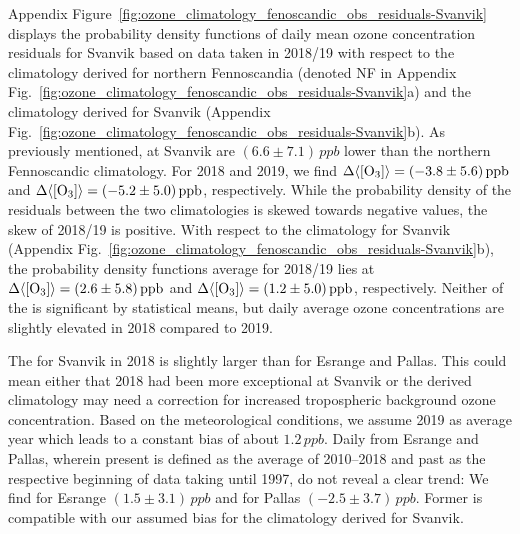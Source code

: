 \documentclass[bg, manuscript]{copernicus}
\begin{document}
Appendix Figure~\ref{fig:ozone_climatology_fenoscandic_obs_residuals-Svanvik} displays the probability density functions of daily mean ozone concentration residuals for Svanvik based on data taken in 2018/19 with respect to the climatology derived for northern Fennoscandia (denoted NF in Appendix Fig.~\ref{fig:ozone_climatology_fenoscandic_obs_residuals-Svanvik}a) and the climatology derived for Svanvik (Appendix Fig.~\ref{fig:ozone_climatology_fenoscandic_obs_residuals-Svanvik}b).
As previously mentioned, \chem{\left<[O_3]\right>} at Svanvik are $(6.6\pm 7.1)\,\unit{ppb}$ lower than the northern Fennoscandic climatology. For 2018 and 2019, we find $\Delta\chem{\left<[O_3]\right>} = (-3.8\pm 5.6)\,\unit{ppb}$ and $\Delta\chem{\left<[O_3]\right>} = (-5.2\pm 5.0)\,\unit{ppb}$, respectively. While the probability density of the residuals between the two climatologies is skewed towards negative values, the skew of 2018/19 is positive.
With respect to the climatology for Svanvik (Appendix Fig.~\ref{fig:ozone_climatology_fenoscandic_obs_residuals-Svanvik}b), the probability density functions average for 2018/19 lies at $\Delta\chem{\left<[O_3]\right>} = (2.6\pm 5.8)\,\unit{ppb}$ and $\Delta\chem{\left<[O_3]\right>} = (1.2\pm 5.0)\,\unit{ppb}$, respectively.
Neither of the \chem{\Delta\left<[O_3]\right>} is significant by statistical means, but daily average ozone concentrations are slightly elevated in 2018 compared to 2019.

The \chem{\left<\Delta\left<[O_3]\right>\right>} for Svanvik in 2018 is slightly larger than for Esrange and Pallas. This could mean either that 2018 had been more exceptional at Svanvik or the derived climatology may need a correction for increased tropospheric background ozone concentration. Based on the meteorological conditions, we assume 2019 as average year which leads to a constant bias of about $1.2\,\unit{ppb}$. Daily  from Esrange and Pallas, wherein present is defined as the average of 2010--2018 and past as the respective beginning of data taking until 1997, do not reveal a clear trend: We find for Esrange $(1.5\pm 3.1)\,\unit{ppb}$ and for Pallas $(-2.5\pm 3.7)\,\unit{ppb}$. Former is compatible with our assumed bias for the climatology derived for Svanvik.
\end{document}
